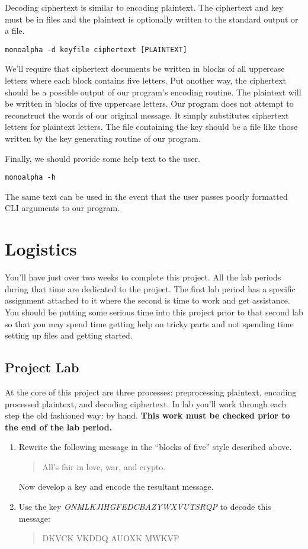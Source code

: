 \documentclass[]{tufte-handout}
\begin{document}
Decoding ciphertext is similar to encoding plaintext. The ciphertext and key must be in files and the plaintext is optionally written to the standard output or a file. 
\begin{verbatim}
monoalpha -d keyfile ciphertext [PLAINTEXT]
\end{verbatim}
We'll require that ciphertext documents be written in blocks of all uppercase letters where each block contains five letters.  Put another way, the ciphertext should be a possible output of our program's encoding routine.  The plaintext will be written in blocks of five uppercase letters. Our program does not attempt to reconstruct the words of our original message. It simply substitutes ciphertext letters for plaintext letters. The file containing the key should be a file like those written by the key generating routine of our program.

Finally, we should provide some help text to the user.
\begin{verbatim}
monoalpha -h
\end{verbatim}
The same text can be used in the event that the user passes poorly formatted CLI arguments to our program.


\section{Logistics}

You'll have just over two weeks to complete this project. All the lab periods during that time are dedicated to the project. The first lab period has a specific assignment attached to it where the second is time to work and get assistance. You should be putting some serious time into this project prior to that second lab so that you may spend time getting help on tricky parts and not spending time setting up files and getting started. 

\subsection{Project Lab}

At the core of this project are three processes: preprocessing plaintext, encoding processed plaintext, and decoding ciphertext. In lab you'll work through each step the old fashioned way: by hand. \textbf{This work must be checked prior to the end of the lab period.}
\begin{enumerate}
\item Rewrite the following message in the ``blocks of five'' style described above.
\begin{quote}
All's fair in love, war, and crypto.
\end{quote}
Now develop a key and encode the resultant message.
\item Use the key \textit{ONMLKJIHGFEDCBAZYWXVUTSRQP} to decode this message:
\begin{quote}
DKVCK VKDDQ AUOXK MWKVP
\end{quote}
\end{enumerate}
\end{document}
